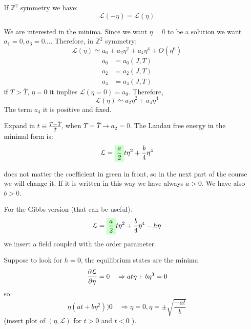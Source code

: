 \documentclass[../main/main.tex]{subfiles}
\begin{document}
If \( \mathbb{Z}^2 \) symmetry we have:
\begin{equation}
  \mathcal{L} (-\eta ) =   \mathcal{L} (\eta )
\end{equation}

We are interested in the minima.
Since we want \( \eta = 0 \) to be a solution we want \( a_1 = 0,a_3= 0 \dots \).
Therefore, in \( \mathbb{Z}^2 \) symmetry:
\begin{equation}
  \mathcal{L} (\eta ) \simeq a_0 + a_2 \eta  ^2 + a_4  \eta  ^4 + O(\eta ^6)
\end{equation}
\begin{subequations}
\begin{align}
  a_0 &= a_0 (J,T) \\
  a_2 &= a_2 (J,T) \\
  a_4 &= a_4 (J,T)
\end{align}
\end{subequations}
if \( T > \bar{T}  \), \( \eta =0 \) it implies \( \mathcal{L} (\eta = 0) = a_0 \). Therefore,
\begin{equation}
    \mathcal{L} (\eta ) \simeq  a_2 \eta  ^2 + a_4  \eta  ^4
\end{equation}
The term \( a_4 \) it is positive and fixed.

Expand in \( t \equiv \frac{T - \bar{T} }{\bar{T} } \), when \( T = \bar{T} \rightarrow a_2 = 0 \).
The Landau free energy in the minimal form is:
\begin{equation}
  \mathcal{L} =  \mathcolorbox{green!20}{\frac{a}{2}} t \eta ^2 + \frac{b}{4} \eta ^4
\end{equation}
\begin{remark}
does not matter the coefficient in green in front, so in the next part of the course we will change it. If it is written in this way we have always \( a>0 \). We have also \( b>0 \).
\end{remark}
For the Gibbs version (that can be useful):
\begin{equation}
  \mathcal{L} =  \mathcolorbox{green!20}{\frac{a}{2}} t \eta ^2 + \frac{b}{4} \eta ^4 - h \eta
\end{equation}
we insert a field coupled with the order parameter.

Suppose to look for \( h=0 \), the equilibrium states are the minima
\begin{equation}
  \pdv{\mathcal{L}}{\eta } = 0 \quad \Rightarrow  a t \eta + b \eta ^3 = 0
\end{equation}
so
\begin{equation}
  \eta (at+b \eta ^2) ) 0 \quad \Rightarrow \eta =0, \eta = \pm \sqrt{\frac{-at}{b}}
\end{equation}
(insert plot of \( (\eta,\mathcal{L}) \) for \( t>0 \)  and \( t<0 \) ).
\end{document}

